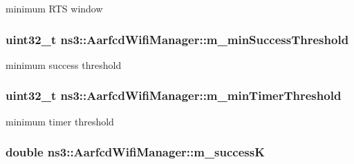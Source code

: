 minimum R\+TS window 

\subsubsection[{\texorpdfstring{m\+\_\+min\+Success\+Threshold}{m_minSuccessThreshold}}]{\setlength{\rightskip}{0pt plus 5cm}uint32\+\_\+t ns3\+::\+Aarfcd\+Wifi\+Manager\+::m\+\_\+min\+Success\+Threshold\hspace{0.3cm}{\ttfamily [private]}}\hypertarget{classns3_1_1AarfcdWifiManager_a5a7025c7463f7b1d003f9c3868018b8d}{}\label{classns3_1_1AarfcdWifiManager_a5a7025c7463f7b1d003f9c3868018b8d}


minimum success threshold 

\subsubsection[{\texorpdfstring{m\+\_\+min\+Timer\+Threshold}{m_minTimerThreshold}}]{\setlength{\rightskip}{0pt plus 5cm}uint32\+\_\+t ns3\+::\+Aarfcd\+Wifi\+Manager\+::m\+\_\+min\+Timer\+Threshold\hspace{0.3cm}{\ttfamily [private]}}\hypertarget{classns3_1_1AarfcdWifiManager_a568403d4a1545d115fa70a262af60c66}{}\label{classns3_1_1AarfcdWifiManager_a568403d4a1545d115fa70a262af60c66}


minimum timer threshold 

\subsubsection[{\texorpdfstring{m\+\_\+successK}{m_successK}}]{\setlength{\rightskip}{0pt plus 5cm}double ns3\+::\+Aarfcd\+Wifi\+Manager\+::m\+\_\+successK\hspace{0.3cm}{\ttfamily [private]}}\hypertarget{classns3_1_1AarfcdWifiManager_a6f0c73ae231af0375391ab04e63cf0b2}{}\label{classns3_1_1AarfcdWifiManager_a6f0c73ae231af0375391ab04e63cf0b2}


